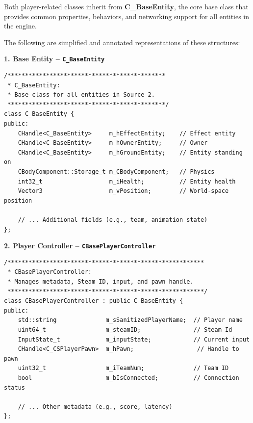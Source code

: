 Both player-related classes inherit from \textbf{C\_BaseEntity}, the core base class that provides common properties, behaviors, and networking support for all entities in the engine.

The following are simplified and annotated representations of these structures:

\vspace*{0.5cm}

\noindent\textbf{1. Base Entity – \texttt{C\_BaseEntity}}

\begin{lstlisting}[style=cppstyle, caption={C\_BaseEntity – Core Class for All Entities}]
/*********************************************
 * C_BaseEntity:
 * Base class for all entities in Source 2.
 *********************************************/
class C_BaseEntity {
public:
    CHandle<C_BaseEntity>     m_hEffectEntity;    // Effect entity 
    CHandle<C_BaseEntity>     m_hOwnerEntity;     // Owner 
    CHandle<C_BaseEntity>     m_hGroundEntity;    // Entity standing on 
    CBodyComponent::Storage_t m_CBodyComponent;   // Physics
    int32_t                   m_iHealth;          // Entity health
    Vector3                   m_vPosition;        // World-space position

    // ... Additional fields (e.g., team, animation state)
};
\end{lstlisting}

\newpage

\noindent\textbf{2. Player Controller – \texttt{CBasePlayerController}}

\begin{lstlisting}[style=cppstyle, caption={CBasePlayerController – Player Metadata and Input Handler}]
/********************************************************
 * CBasePlayerController:
 * Manages metadata, Steam ID, input, and pawn handle.
 ********************************************************/
class CBasePlayerController : public C_BaseEntity {
public:
    std::string              m_sSanitizedPlayerName;  // Player name 
    uint64_t                 m_steamID;               // Steam Id
    InputState_t             m_inputState;            // Current input 
    CHandle<C_CSPlayerPawn>  m_hPawn;                  // Handle to pawn 
    uint32_t                 m_iTeamNum;              // Team ID
    bool                     m_bIsConnected;          // Connection status

    // ... Other metadata (e.g., score, latency)
};
\end{lstlisting}




